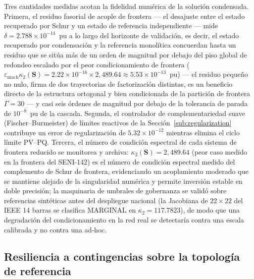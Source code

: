 Tres cantidades medidas acotan la fidelidad numérica de la solución condensada. Primera, el residuo fasorial de acople de frontera --- el desajuste entre el estado recuperado por Schur y un estado de referencia independiente --- mide $\delta = 2.788 \times 10^{-14}$~pu a lo largo del horizonte de validación, es decir, el estado recuperado por condensación y la referencia monolítica concuerdan hasta un residuo que se sitúa más de un orden de magnitud por debajo del piso global de redondeo escalado por el peor condicionamiento de frontera ($\varepsilon_{\mathrm{mach}}\kappa_2(\mathbf{S}) = 2.22 \times 10^{-16} \times 2{,}489.64 \approx 5.53 \times 10^{-13}$~pu) --- el residuo pequeño no nulo, firma de dos trayectorias de factorización distintas, es un beneficio directo de la estructura ortogonal y bien condicionada de la partición de frontera $\Gamma = 30$ --- y casi seis órdenes de magnitud por debajo de la tolerancia de parada de $10^{-8}$~pu de la cascada. Segunda, el controlador de complementariedad suave (Fischer--Burmeister) de límites reactivos de la Sección~\ref{sub:regularization} contribuye un error de regularización de $5.32 \times 10^{-12}$ mientras elimina el ciclo límite PV--PQ. Tercera, el número de condición espectral de cada sistema de frontera reducido se monitorea y archiva: $\kappa_2(\mathbf{S}) = 2{,}489.64$ (peor caso medido en la frontera del SENI-142) es el número de condición espectral medido del complemento de Schur de frontera, evidenciando un acoplamiento moderado que se mantiene alejado de la singularidad numérica y permite inversión estable en doble precisión; la maquinaria de umbrales de gobernanza se validó sobre referencias sintéticas antes del despliegue nacional (la Jacobiana de $22\times22$ del IEEE 14 barras se clasifica MARGINAL en $\kappa_2 = 117.7823$), de modo que una degradación del condicionamiento en la red real se detectaría contra una escala calibrada y no contra una ad-hoc.

\subsection{Resiliencia a contingencias sobre la topología de referencia}
\label{sub:contingencies}


